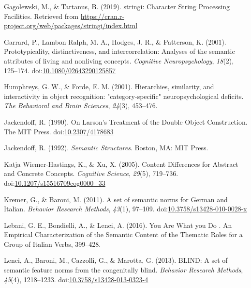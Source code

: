 \documentclass[man]{apa6}
\begin{document}
\leavevmode\hypertarget{ref-Gagolewski2019}{}%
Gagolewski, M., \& Tartanus, B. (2019). stringi: Character String Processing Facilities. Retrieved from \url{https://cran.r-project.org/web/packages/stringi/index.html}

\leavevmode\hypertarget{ref-Garrard2001}{}%
Garrard, P., Lambon Ralph, M. A., Hodges, J. R., \& Patterson, K. (2001). Prototypicality, distinctiveness, and intercorrelation: Analyses of the semantic attributes of living and nonliving concepts. \emph{Cognitive Neuropsychology}, \emph{18}(2), 125--174. doi:\href{https://doi.org/10.1080/02643290125857}{10.1080/02643290125857}

\leavevmode\hypertarget{ref-Humphreys2001}{}%
Humphreys, G. W., \& Forde, E. M. (2001). Hierarchies, similarity, and interactivity in object recognition: "category-specific" neuropsychological deficits. \emph{The Behavioral and Brain Sciences}, \emph{24}(3), 453--476.

\leavevmode\hypertarget{ref-Jackendoff}{}%
Jackendoff, R. (1990). On Larson's Treatment of the Double Object Construction. The MIT Press. doi:\href{https://doi.org/10.2307/4178683}{10.2307/4178683}

\leavevmode\hypertarget{ref-Jackendoff1992}{}%
Jackendoff, R. (1992). \emph{Semantic Structures}. Boston, MA: MIT Press.

\leavevmode\hypertarget{ref-KatjaWiemer-Hastings2005}{}%
Katja Wiemer-Hastings, K., \& Xu, X. (2005). Content Differences for Abstract and Concrete Concepts. \emph{Cognitive Science}, \emph{29}(5), 719--736. doi:\href{https://doi.org/10.1207/s15516709cog0000_33}{10.1207/s15516709cog0000\_33}

\leavevmode\hypertarget{ref-Kremer2011a}{}%
Kremer, G., \& Baroni, M. (2011). A set of semantic norms for German and Italian. \emph{Behavior Research Methods}, \emph{43}(1), 97--109. doi:\href{https://doi.org/10.3758/s13428-010-0028-x}{10.3758/s13428-010-0028-x}

\leavevmode\hypertarget{ref-Lebani2016}{}%
Lebani, G. E., Bondielli, A., \& Lenci, A. (2016). You Are What you Do . An Empirical Characterization of the Semantic Content of the Thematic Roles for a Group of Italian Verbs, 399--428.

\leavevmode\hypertarget{ref-Lenci2013}{}%
Lenci, A., Baroni, M., Cazzolli, G., \& Marotta, G. (2013). BLIND: A set of semantic feature norms from the congenitally blind. \emph{Behavior Research Methods}, \emph{45}(4), 1218--1233. doi:\href{https://doi.org/10.3758/s13428-013-0323-4}{10.3758/s13428-013-0323-4}
\end{document}
